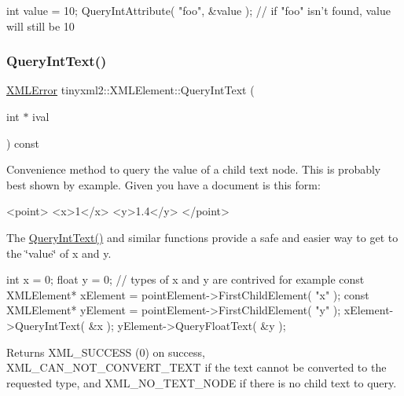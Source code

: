 \begin{DoxyVerb}int value = 10;
QueryIntAttribute( "foo", &value );     // if "foo" isn't found, value will still be 10
\end{DoxyVerb}
 \mbox{\label{classtinyxml2_1_1_x_m_l_element_a926357996bef633cb736e1a558419632}} 
\subsubsection{\texorpdfstring{Query\+Int\+Text()}{QueryIntText()}}
{\footnotesize\ttfamily \hyperlink{namespacetinyxml2_a1fbf88509c3ac88c09117b1947414e08}{X\+M\+L\+Error} tinyxml2\+::\+X\+M\+L\+Element\+::\+Query\+Int\+Text (\begin{DoxyParamCaption}\item[{int $\ast$}]{ival }\end{DoxyParamCaption}) const}

Convenience method to query the value of a child text node. This is probably best shown by example. Given you have a document is this form\+: \begin{DoxyVerb}<point>
<x>1</x>
<y>1.4</y>
</point>
\end{DoxyVerb}


The \hyperlink{classtinyxml2_1_1_x_m_l_element_a926357996bef633cb736e1a558419632}{Query\+Int\+Text()} and similar functions provide a safe and easier way to get to the \char`\"{}value\char`\"{} of x and y.

\begin{DoxyVerb}int x = 0;
float y = 0;    // types of x and y are contrived for example
const XMLElement* xElement = pointElement->FirstChildElement( "x" );
const XMLElement* yElement = pointElement->FirstChildElement( "y" );
xElement->QueryIntText( &x );
yElement->QueryFloatText( &y );
\end{DoxyVerb}


\begin{DoxyReturn}{Returns}
X\+M\+L\+\_\+\+S\+U\+C\+C\+E\+SS (0) on success, X\+M\+L\+\_\+\+C\+A\+N\+\_\+\+N\+O\+T\+\_\+\+C\+O\+N\+V\+E\+R\+T\+\_\+\+T\+E\+XT if the text cannot be converted to the requested type, and X\+M\+L\+\_\+\+N\+O\+\_\+\+T\+E\+X\+T\+\_\+\+N\+O\+DE if there is no child text to query. 
\end{DoxyReturn}
\mbox{\label{classtinyxml2_1_1_x_m_l_element_a26fc84cbfba6769dafcfbf256c05e22f}} 
